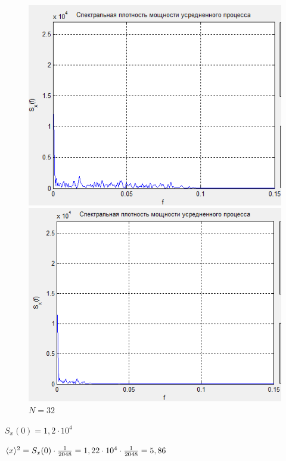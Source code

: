  \begin{figure}[H]
	\begin{minipage}{.45\linewidth}
		\centering
       \includegraphics[width=\linewidth]{fig/fig52}
	\caption*{$N = 4$}
	\end{minipage}
	\begin{minipage}{.45\linewidth}
		\centering
        \includegraphics[width=\linewidth]{fig/fig53}
	\caption*{$N = 32$}
	\end{minipage}
\end{figure}

$S_x(0)=1,2\cdot 10^4$

$\langle x\rangle^2 = S_x(0)\cdot \frac{1}{2048}= 1,22\cdot 10^4\cdot \frac{1}{2048} = 5,86$

